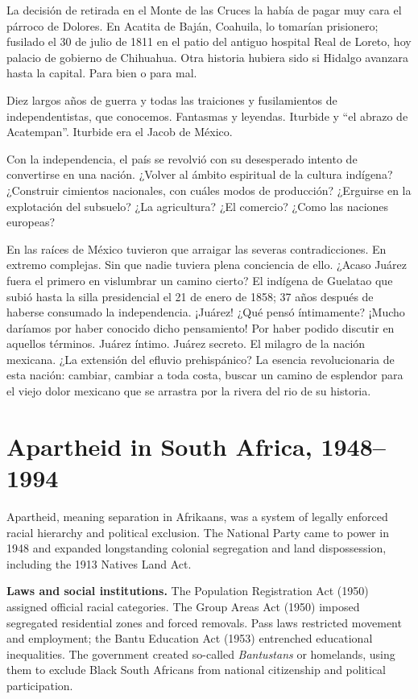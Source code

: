 La decisión de retirada en el Monte de las
Cruces la había de pagar muy cara el párroco
de Dolores. En Acatita de Baján, Coahuila, lo
tomarían prisionero; fusilado el 30 de julio
de 1811 en el patio del antiguo hospital Real
de Loreto, hoy palacio de gobierno de
Chihuahua. Otra historia hubiera sido si
Hidalgo avanzara hasta la capital. Para bien
o para mal.

Diez largos años de guerra y todas las
traiciones y fusilamientos de
independentistas, que conocemos. Fantasmas y
leyendas. Iturbide y “el abrazo de
Acatempan”. Iturbide era el Jacob de México.

Con la independencia, el país se revolvió con
su desesperado intento de convertirse en una
nación. ¿Volver al ámbito espiritual de la
cultura indígena? ¿Construir cimientos
nacionales, con cuáles modos de producción?
¿Erguirse en la explotación del subsuelo? ¿La
agricultura? ¿El comercio? ¿Como las naciones
europeas?

En las raíces de México tuvieron que arraigar
las severas contradicciones. En extremo
complejas. Sin que nadie tuviera plena
conciencia de ello. ¿Acaso Juárez fuera el
primero en vislumbrar un camino cierto? El
indígena de Guelatao que subió hasta la silla
presidencial el 21 de enero de 1858; 37 años
después de haberse consumado la
independencia. ¡Juárez! ¿Qué pensó
íntimamente? ¡Mucho daríamos por haber
conocido dicho pensamiento! Por haber podido
discutir en aquellos términos. Juárez íntimo.
Juárez secreto. El milagro de la nación
mexicana. ¿La extensión del efluvio
prehispánico? La esencia revolucionaria de
esta nación: cambiar, cambiar a toda costa,
buscar un camino de esplendor para el viejo
dolor mexicano que se arrastra por la rivera
del rio de su historia.


\section{Apartheid in South Africa,
1948--1994}
\label{section-apartheid}

Apartheid, meaning separation in
Afrikaans, was a system of legally
enforced racial hierarchy and political
exclusion. The National Party came to
power in 1948 and expanded longstanding
colonial segregation and land dispossession,
including the 1913 Natives Land Act.

\medskip\noindent
{\bf Laws and social institutions.}
The Population Registration Act (1950)
assigned official racial categories.
The Group Areas Act (1950) imposed
segregated residential zones and
forced removals. Pass laws restricted
movement and employment; the Bantu
Education Act (1953) entrenched
educational inequalities. The
government created so-called
\emph{Bantustans} or homelands,
using them to exclude Black South
Africans from national citizenship
and political participation.

